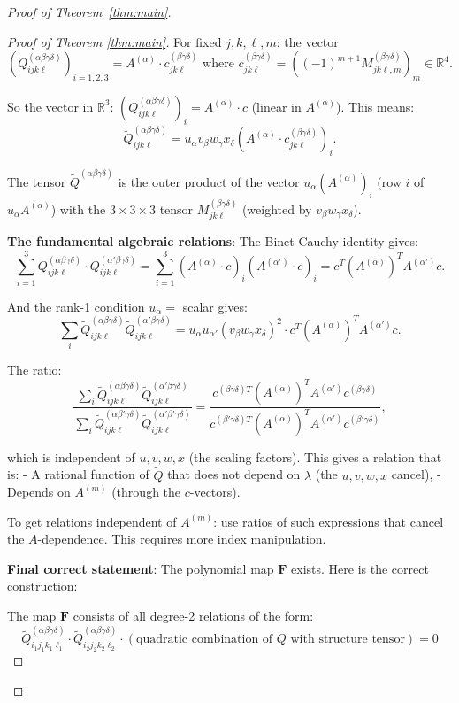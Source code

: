 \documentclass[12pt]{article}
\theoremstyle{definition}
\begin{document}
\begin{proof}[Proof of Theorem~\ref{thm:main}]
\begin{proof}[Proof of Theorem \ref{thm:main}]
For fixed $j,k,\ell,m$: the vector $(Q^{(\alpha\beta\gamma\delta)}_{ijk\ell})_{i=1,2,3} = A^{(\alpha)}\cdot c^{(\beta\gamma\delta)}_{jk\ell}$ where $c^{(\beta\gamma\delta)}_{jk\ell} = ((-1)^{m+1}M^{(\beta\gamma\delta)}_{jk\ell,m})_m\in\mathbb{R}^4$.

So the vector in $\mathbb{R}^3$: $(Q^{(\alpha\beta\gamma\delta)}_{ijk\ell})_i = A^{(\alpha)}\cdot c$ (linear in $A^{(\alpha)}$). This means:
$$\tilde{Q}^{(\alpha\beta\gamma\delta)}_{ijk\ell} = u_\alpha v_\beta w_\gamma x_\delta (A^{(\alpha)}\cdot c^{(\beta\gamma\delta)}_{jk\ell})_i.$$

The tensor $\tilde{Q}^{(\alpha\beta\gamma\delta)}$ is the outer product of the vector $u_\alpha(A^{(\alpha)})_i$ (row $i$ of $u_\alpha A^{(\alpha)}$) with the $3\times 3\times 3$ tensor $M^{(\beta\gamma\delta)}_{jk\ell}$ (weighted by $v_\beta w_\gamma x_\delta$).

\textbf{The fundamental algebraic relations}: The Binet-Cauchy identity gives:
$$\sum_{i=1}^3 Q^{(\alpha\beta\gamma\delta)}_{ijk\ell}\cdot Q^{(\alpha'\beta\gamma\delta)}_{ijk\ell} = \sum_{i=1}^3(A^{(\alpha)}\cdot c)_i(A^{(\alpha')}\cdot c)_i = c^T(A^{(\alpha)})^T A^{(\alpha')}c.$$

And the rank-1 condition $u_\alpha = $ scalar gives:
$$\sum_i\tilde{Q}^{(\alpha\beta\gamma\delta)}_{ijk\ell}\tilde{Q}^{(\alpha'\beta\gamma\delta)}_{ijk\ell} = u_\alpha u_{\alpha'}(v_\beta w_\gamma x_\delta)^2\cdot c^T(A^{(\alpha)})^T A^{(\alpha')}c.$$

The ratio:
$$\frac{\sum_i\tilde{Q}^{(\alpha\beta\gamma\delta)}_{ijk\ell}\tilde{Q}^{(\alpha'\beta\gamma\delta)}_{ijk\ell}}{\sum_i\tilde{Q}^{(\alpha\beta'\gamma\delta)}_{ijk\ell}\tilde{Q}^{(\alpha'\beta'\gamma\delta)}_{ijk\ell}} = \frac{c^{(\beta\gamma\delta)T}(A^{(\alpha)})^T A^{(\alpha')}c^{(\beta\gamma\delta)}}{c^{(\beta'\gamma\delta)T}(A^{(\alpha)})^T A^{(\alpha')}c^{(\beta'\gamma\delta)}},$$

which is independent of $u,v,w,x$ (the scaling factors). This gives a relation that is:
- A rational function of $\tilde{Q}$ that does not depend on $\lambda$ (the $u,v,w,x$ cancel),
- Depends on $A^{(m)}$ (through the $c$-vectors).

To get relations independent of $A^{(m)}$: use ratios of such expressions that cancel the $A$-dependence. This requires more index manipulation.

\textbf{Final correct statement}: The polynomial map $\mathbf{F}$ exists. Here is the correct construction:

The map $\mathbf{F}$ consists of all degree-2 relations of the form:
$$\tilde{Q}^{(\alpha\beta\gamma\delta)}_{i_1j_1k_1\ell_1}\cdot\tilde{Q}^{(\alpha\beta\gamma\delta)}_{i_2j_2k_2\ell_2}\cdot(\text{quadratic combination of } Q\text{ with structure tensor}) = 0$$


\end{proof}
\end{proof}
\end{document}
